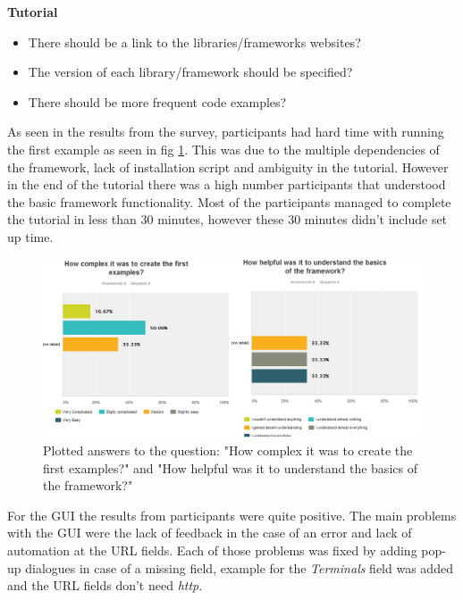 \textbf{Tutorial}
\begin{itemize}
\item There should be a link to the libraries/frameworks websites?
\item The version of each library/framework should be specified?
\item There should be more frequent code examples?
\end{itemize}

As seen in the results from the survey, participants had hard time with running the first example as seen in fig \ref{fig:firstex}. This was due to the multiple dependencies of the
framework, lack of installation script and ambiguity in the tutorial. However
in the end of the tutorial there was a high number participants that understood the basic framework functionality. Most of the participants managed to complete the tutorial
in less than 30 minutes, however these 30 minutes didn't include set up time.

\begin{figure}[htp]
\centering
\includegraphics[scale=0.5]{Figures/q1.png}
\caption{Plotted answers to the question: "How complex it was to create the first examples?" and "How helpful was it to understand the basics of the framework?" }
\label{fig:firstex}
\end{figure}

For the GUI the results from participants were quite positive. The main problems with the GUI were the lack of feedback in the case of an error and lack of automation
at the URL fields. Each of those problems was fixed by adding pop-up dialogues in case of a missing field, example for the \textit{Terminals} field was added and the
URL fields don't need \textit{http}.